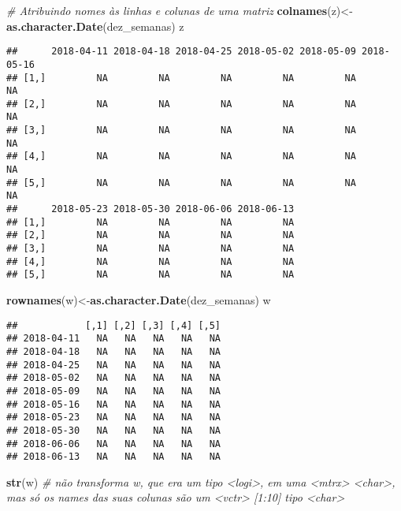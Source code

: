 \documentclass[]{article}
\newenvironment{Shaded}{\begin{snugshade}}{\end{snugshade}}
\newcommand{\KeywordTok}[1]{\textcolor[rgb]{0.13,0.29,0.53}{\textbf{#1}}}
\newcommand{\CommentTok}[1]{\textcolor[rgb]{0.56,0.35,0.01}{\textit{#1}}}
\newcommand{\NormalTok}[1]{#1}
\begin{document}
\begin{Shaded}
\begin{Highlighting}[]
\CommentTok{# Atribuindo nomes às linhas e colunas de uma matriz}
\KeywordTok{colnames}\NormalTok{(z)<-}\KeywordTok{as.character.Date}\NormalTok{(dez_semanas)}
\NormalTok{z}
\end{Highlighting}
\end{Shaded}

\begin{verbatim}
##      2018-04-11 2018-04-18 2018-04-25 2018-05-02 2018-05-09 2018-05-16
## [1,]         NA         NA         NA         NA         NA         NA
## [2,]         NA         NA         NA         NA         NA         NA
## [3,]         NA         NA         NA         NA         NA         NA
## [4,]         NA         NA         NA         NA         NA         NA
## [5,]         NA         NA         NA         NA         NA         NA
##      2018-05-23 2018-05-30 2018-06-06 2018-06-13
## [1,]         NA         NA         NA         NA
## [2,]         NA         NA         NA         NA
## [3,]         NA         NA         NA         NA
## [4,]         NA         NA         NA         NA
## [5,]         NA         NA         NA         NA
\end{verbatim}

\begin{Shaded}
\begin{Highlighting}[]
\KeywordTok{rownames}\NormalTok{(w)<-}\KeywordTok{as.character.Date}\NormalTok{(dez_semanas)}
\NormalTok{w}
\end{Highlighting}
\end{Shaded}

\begin{verbatim}
##            [,1] [,2] [,3] [,4] [,5]
## 2018-04-11   NA   NA   NA   NA   NA
## 2018-04-18   NA   NA   NA   NA   NA
## 2018-04-25   NA   NA   NA   NA   NA
## 2018-05-02   NA   NA   NA   NA   NA
## 2018-05-09   NA   NA   NA   NA   NA
## 2018-05-16   NA   NA   NA   NA   NA
## 2018-05-23   NA   NA   NA   NA   NA
## 2018-05-30   NA   NA   NA   NA   NA
## 2018-06-06   NA   NA   NA   NA   NA
## 2018-06-13   NA   NA   NA   NA   NA
\end{verbatim}

\begin{Shaded}
\begin{Highlighting}[]
\KeywordTok{str}\NormalTok{(w) }\CommentTok{# não transforma w, que era um tipo <logi>, em uma <mtrx> <char>, mas só os names das suas colunas são um <vctr> [1:10] tipo <char>}
\end{Highlighting}
\end{Shaded}
\end{document}
